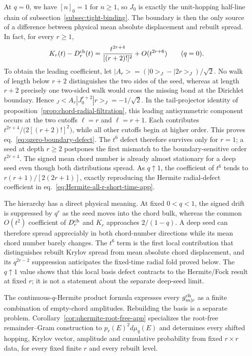 \documentclass[a4paper,11pt]{article}
\def\ket#1{|#1>}%
\def\bra#1{<#1|}%
\def\dd{d}%
\def\Jac{J}%
\theoremstyle{definition}
\theoremstyle{remark}
\newcommand{\ket}[1]{|#1\rangle}
\newcommand{\bra}[1]{\langle #1|}
\newcommand{\dd}{\mathrm d}
\newcommand{\Jac}{\mathsf J}
\begin{document}
At $q=0$, we have $[n]_0=1$ for $n\ge1$, so $\Jac_0$ is exactly the
unit-hopping half-line chain of subsection~\ref{subsec:tight-binding}.  The boundary is then the
only source of a difference between physical mean absolute displacement and rebuilt spread.  In
fact, for every $r\ge1$,
\begin{equation}
   K_r(t)-D_r^{\rm ch}(t)
   =\frac{t^{2r+4}}{[(r+2)!]^2}+O(t^{2r+6})
   \qquad(q=0).
   \label{eq:qzero-boundary-defect}
\end{equation}
To obtain the leading coefficient, let
$\ket{A_r}=(\ket0_{\Jac}-\ket{2r}_{\Jac})/\sqrt2$.
No walk of length below $r+2$ distinguishes the two sides of the seed, whereas at length $r+2$
precisely one two-sided walk would cross the missing bond at the Dirichlet boundary.  Hence
${}_{\Jac}\!\bra{A_r}\Jac_0^{r+2}\ket r_{\Jac}=-1/\sqrt2$.
In the tail-projector identity of proposition~\ref{prop:chord-radial-filtration}, this leading
antisymmetric component occurs at the two cutoffs $\ell=r$ and $\ell=r+1$.  Each contributes
$t^{2r+4}/\bigl(2[(r+2)!]^2\bigr)$, while all other cutoffs begin at higher order.  This proves
eq.~\eqref{eq:qzero-boundary-defect}.  The $t^6$ defect therefore survives only for $r=1$; a seed
at depth $r\ge2$ postpones the first mismatch to the boundary-sensitive order $t^{2r+4}$.
The signed mean
chord number is already almost stationary for a deep seed even though both distributions spread.
As $q\uparrow1$, the coefficient of $t^6$ tends to
$r(r+1)/[2(2r+1)]$, exactly reproducing the Hermite radial-defect coefficient in
eq.~\eqref{eq:Hermite-all-r-short-time-app}. 

The hierarchy has a direct physical meaning.  At fixed $0<q<1$, the signed drift is
suppressed by $q^r$ as the seed moves into the chord bulk, whereas the common $O(t^2)$ coefficient
of $D_r^{\rm ch}$ and $K_r$ approaches $2/(1-q)$.  A deep seed can therefore spread appreciably in
both chord-number directions while its mean chord number barely changes.  The $t^6$ term is the
first local contribution that distinguishes rebuilt Krylov spread from mean absolute chord
displacement, and its $q^{2r-2}$ suppression anticipates the fixed-time radial fold proved below.
The $q\uparrow1$ value shows that this local basis defect contracts to the Hermite/Fock result at
fixed $r$; it is not a statement about the separate deep-seed limit.

The continuous-$q$-Hermite product formula expresses every
$g_{m|r}^{\rm ch}$ as a finite combination of
empty-chord amplitudes.  Rebuilding the basis is a separate problem.
Corollary~\ref{cor:qhermite-root-free-app} specializes the root-free remainder--Gram construction
to $p_r(E)^2\dd\mu_q(E)$ and determines every shifted hopping, Krylov vector, amplitude and
cumulative probability from fixed $r\times r$ data, for every fixed finite $r$ and every rebuilt
level.
\end{document}

